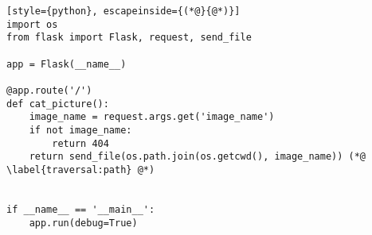 \begin{lstlisting}[style={python}, escapeinside={(*@}{@*)}]
import os
from flask import Flask, request, send_file

app = Flask(__name__)

@app.route('/')
def cat_picture():
    image_name = request.args.get('image_name')
    if not image_name:
        return 404
    return send_file(os.path.join(os.getcwd(), image_name)) (*@ \label{traversal:path} @*)


if __name__ == '__main__':
    app.run(debug=True)
\end{lstlisting}
